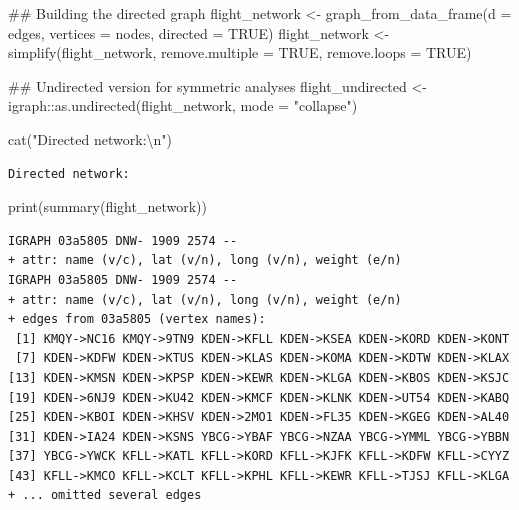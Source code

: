 \documentclass[
  letterpaper,
]{report}
\newenvironment{Shaded}{}{}
\newcommand{\AttributeTok}[1]{\textcolor[rgb]{0.84,0.23,0.29}{#1}}
\newcommand{\ConstantTok}[1]{\textcolor[rgb]{0.00,0.36,0.77}{#1}}
\newcommand{\DocumentationTok}[1]{\textcolor[rgb]{0.42,0.45,0.49}{#1}}
\newcommand{\FunctionTok}[1]{\textcolor[rgb]{0.44,0.26,0.76}{#1}}
\newcommand{\NormalTok}[1]{\textcolor[rgb]{0.14,0.16,0.18}{#1}}
\newcommand{\OtherTok}[1]{\textcolor[rgb]{0.44,0.26,0.76}{#1}}
\newcommand{\SpecialCharTok}[1]{\textcolor[rgb]{0.00,0.36,0.77}{#1}}
\newcommand{\StringTok}[1]{\textcolor[rgb]{0.01,0.18,0.38}{#1}}
\begin{document}
\begin{Shaded}
\begin{Highlighting}[]
\DocumentationTok{\#\# Building the directed graph}
\NormalTok{flight\_network }\OtherTok{\textless{}{-}} \FunctionTok{graph\_from\_data\_frame}\NormalTok{(}\AttributeTok{d =}\NormalTok{ edges, }\AttributeTok{vertices =}\NormalTok{ nodes, }\AttributeTok{directed =} \ConstantTok{TRUE}\NormalTok{)}
\NormalTok{flight\_network }\OtherTok{\textless{}{-}} \FunctionTok{simplify}\NormalTok{(flight\_network, }\AttributeTok{remove.multiple =} \ConstantTok{TRUE}\NormalTok{, }\AttributeTok{remove.loops =} \ConstantTok{TRUE}\NormalTok{)}

\DocumentationTok{\#\# Undirected version for symmetric analyses}
\NormalTok{flight\_undirected }\OtherTok{\textless{}{-}}\NormalTok{ igraph}\SpecialCharTok{::}\FunctionTok{as.undirected}\NormalTok{(flight\_network, }\AttributeTok{mode =} \StringTok{"collapse"}\NormalTok{)}

\FunctionTok{cat}\NormalTok{(}\StringTok{"Directed network:}\SpecialCharTok{\textbackslash{}n}\StringTok{"}\NormalTok{)}
\end{Highlighting}
\end{Shaded}

\begin{verbatim}
Directed network:
\end{verbatim}

\begin{Shaded}
\begin{Highlighting}[]
\FunctionTok{print}\NormalTok{(}\FunctionTok{summary}\NormalTok{(flight\_network))}
\end{Highlighting}
\end{Shaded}

\begin{verbatim}
IGRAPH 03a5805 DNW- 1909 2574 -- 
+ attr: name (v/c), lat (v/n), long (v/n), weight (e/n)
IGRAPH 03a5805 DNW- 1909 2574 -- 
+ attr: name (v/c), lat (v/n), long (v/n), weight (e/n)
+ edges from 03a5805 (vertex names):
 [1] KMQY->NC16 KMQY->9TN9 KDEN->KFLL KDEN->KSEA KDEN->KORD KDEN->KONT
 [7] KDEN->KDFW KDEN->KTUS KDEN->KLAS KDEN->KOMA KDEN->KDTW KDEN->KLAX
[13] KDEN->KMSN KDEN->KPSP KDEN->KEWR KDEN->KLGA KDEN->KBOS KDEN->KSJC
[19] KDEN->6NJ9 KDEN->KU42 KDEN->KMCF KDEN->KLNK KDEN->UT54 KDEN->KABQ
[25] KDEN->KBOI KDEN->KHSV KDEN->2MO1 KDEN->FL35 KDEN->KGEG KDEN->AL40
[31] KDEN->IA24 KDEN->KSNS YBCG->YBAF YBCG->NZAA YBCG->YMML YBCG->YBBN
[37] YBCG->YWCK KFLL->KATL KFLL->KORD KFLL->KJFK KFLL->KDFW KFLL->CYYZ
[43] KFLL->KMCO KFLL->KCLT KFLL->KPHL KFLL->KEWR KFLL->TJSJ KFLL->KLGA
+ ... omitted several edges
\end{verbatim}
\end{document}

